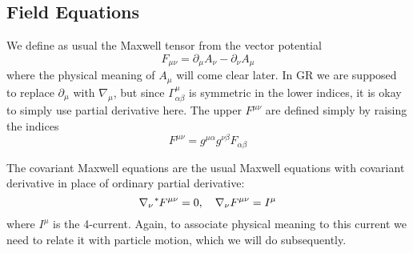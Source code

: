 \subsection{Field Equations}
\label{sec:field}

We define as usual the Maxwell tensor from the vector potential
\begin{equation}
  \label{eq:6}
  F_{\mu\nu} = \partial_{\mu}A_{\nu} - \partial_{\nu}A_{\mu}
\end{equation}
where the physical meaning of $A_{\mu}$ will come clear later. In GR we are
supposed to replace $\partial_{\mu}$ with $\nabla_{\mu}$, but since
$\Gamma_{\alpha\beta}^{\mu}$ is symmetric in the lower indices, it is okay to
simply use partial derivative here. The upper $F^{\mu\nu}$ are defined simply by
raising the indices
\begin{equation}
  \label{eq:8}
  F^{\mu\nu} = g^{\mu\alpha}g^{\nu\beta}F_{\alpha\beta}
\end{equation}


The covariant Maxwell equations are the usual Maxwell equations with covariant
derivative in place of ordinary partial derivative:
\begin{equation}
  \label{eq:7}
  \nabla_{\nu}\tensor[^{*}]{F}{^{\mu\nu}} = 0, \quad \nabla_{\nu}F^{\mu\nu} = I^{\mu}
\end{equation}
where $I^{\mu}$ is the 4-current. Again, to associate physical meaning to this
current we need to relate it with particle motion, which we will do
subsequently.


